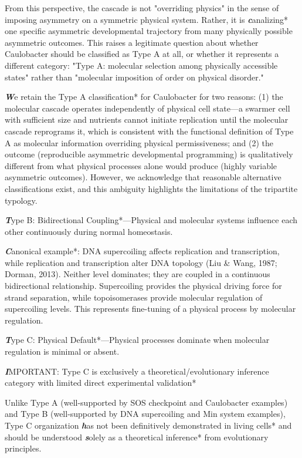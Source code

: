 \documentclass[11pt,a4paper]{article}
\begin{document}
From this perspective, the cascade is not "overriding physics" in the sense of imposing asymmetry on a symmetric physical system. Rather, it is \textbf\textit*canalizing* one specific asymmetric developmental trajectory from many physically possible asymmetric outcomes. This raises a legitimate question about whether Caulobacter should be classified as Type A at all, or whether it represents a different category: "Type A: molecular selection among physically accessible states" rather than "molecular imposition of order on physical disorder."

\textbf\textit*We retain the Type A classification* for Caulobacter for two reasons: (1) the molecular cascade operates independently of physical cell state—a swarmer cell with sufficient size and nutrients cannot initiate replication until the molecular cascade reprograms it, which is consistent with the functional definition of Type A as molecular information overriding physical permissiveness; and (2) the outcome (reproducible asymmetric developmental programming) is qualitatively different from what physical processes alone would produce (highly variable asymmetric outcomes). However, we acknowledge that reasonable alternative classifications exist, and this ambiguity highlights the limitations of the tripartite typology.

\textbf\textit*Type B: Bidirectional Coupling*—Physical and molecular systems influence each other continuously during normal homeostasis.

\textbf\textit*Canonical example*: DNA supercoiling affects replication and transcription, while replication and transcription alter DNA topology (Liu & Wang, 1987; Dorman, 2013). Neither level dominates; they are coupled in a continuous bidirectional relationship. Supercoiling provides the physical driving force for strand separation, while topoisomerases provide molecular regulation of supercoiling levels. This represents fine-tuning of a physical process by molecular regulation.

\textbf\textit*Type C: Physical Default*—Physical processes dominate when molecular regulation is minimal or absent.

\textbf\textit*IMPORTANT: Type C is exclusively a theoretical/evolutionary inference category with limited direct experimental validation*

Unlike Type A (well-supported by SOS checkpoint and Caulobacter examples) and Type B (well-supported by DNA supercoiling and Min system examples), Type C organization \textbf\textit*has not been definitively demonstrated in living cells* and should be understood \textbf\textit*solely as a theoretical inference* from evolutionary principles.
\end{document}
